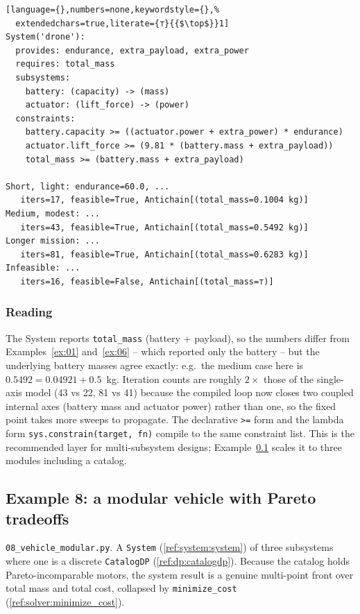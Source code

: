 \documentclass[11pt,a4paper]{article}
\begin{document}
\begin{lstlisting}[language={},numbers=none,keywordstyle={},%
  extendedchars=true,literate={⊤}{{$\top$}}1]
System('drone'):
  provides: endurance, extra_payload, extra_power
  requires: total_mass
  subsystems:
    battery: (capacity) -> (mass)
    actuator: (lift_force) -> (power)
  constraints:
    battery.capacity >= ((actuator.power + extra_power) * endurance)
    actuator.lift_force >= (9.81 * (battery.mass + extra_payload))
    total_mass >= (battery.mass + extra_payload)

Short, light: endurance=60.0, ...
   iters=17, feasible=True, Antichain[(total_mass=0.1004 kg)]
Medium, modest: ...
   iters=43, feasible=True, Antichain[(total_mass=0.5492 kg)]
Longer mission: ...
   iters=81, feasible=True, Antichain[(total_mass=0.6283 kg)]
Infeasible: ...
   iters=16, feasible=False, Antichain[(total_mass=⊤)]
\end{lstlisting}

\subsubsection*{Reading}

The System reports \texttt{total\_mass} (battery + payload), so the
numbers differ from Examples~\ref{ex:01} and~\ref{ex:06} -- which reported
only the battery -- but the underlying battery masses agree exactly:
e.g.\ the medium case here is $0.5492 = 0.04921 + 0.5$~kg. Iteration
counts are roughly $2\times$ those of the single-axis model (43 vs 22, 81
vs 41) because the compiled loop now closes two coupled internal axes
(battery mass and actuator power) rather than one, so the fixed point
takes more sweeps to propagate. The declarative \texttt{>=} form and the
lambda form \texttt{sys.constrain(target, fn)} compile to the same
constraint list. This is the recommended layer for multi-subsystem
designs; Example~\ref{ex:08} scales it to three modules including a
catalog.

\subsection{Example 8: a modular vehicle with Pareto tradeoffs}\label{ex:08}

\texttt{08\_vehicle\_modular.py}. A \texttt{System}
(\ref{ref:system:system}) of three subsystems where one is a discrete
\texttt{CatalogDP} (\ref{ref:dp:catalogdp}). Because the catalog holds
Pareto-incomparable motors, the system result is a genuine multi-point
front over total mass and total cost, collapsed by
\texttt{minimize\_cost} (\ref{ref:solver:minimize_cost}).
\end{document}
